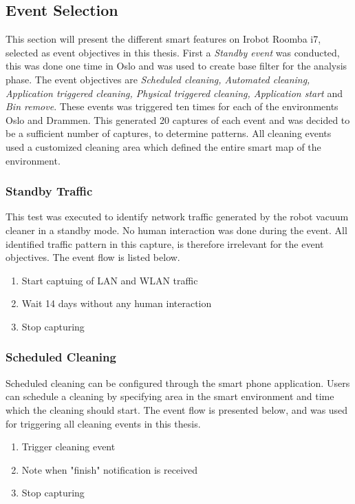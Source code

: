 \subsection{Event Selection}
This section will present the different smart features on Irobot Roomba i7, selected as event objectives in this thesis. First a \textit{Standby event} was conducted, this was done one time in Oslo and  was used to create base filter for the analysis phase. The event objectives are \textit{Scheduled cleaning, Automated cleaning, Application triggered cleaning, Physical triggered cleaning, Application start} and \textit{Bin remove}. These events was triggered ten times for each of the environments Oslo and Drammen. This generated 20 captures of each event and was decided to be a sufficient number of captures, to determine patterns. All cleaning events used a customized cleaning area which defined the entire smart map of the environment.   

\subsubsection{Standby Traffic}
This test was executed to identify network traffic generated by the robot vacuum cleaner in a standby mode. No human interaction was done during the event. All identified traffic pattern in this capture, is therefore irrelevant for the event objectives. The event flow is listed below. 

 \begin{enumerate}
         \item Start captuing of LAN and WLAN traffic
         \item Wait 14 days without any human interaction
         \item Stop capturing
\end{enumerate}

\subsubsection{Scheduled Cleaning}
Scheduled cleaning can be configured through the smart phone application. Users can schedule a cleaning by specifying area in the smart environment and time which the cleaning should start. The event flow is presented below, and was used for triggering all cleaning events in this thesis. 

\begin{enumerate}
  \item Trigger cleaning event
  \item Note when "finish" notification is received
  \item Stop capturing
\end{enumerate}


